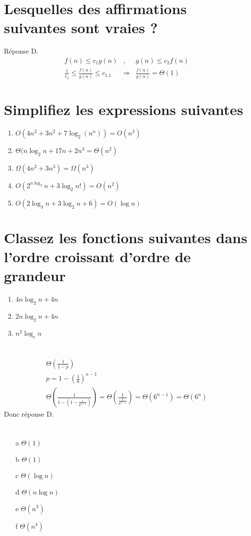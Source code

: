 \section{Lesquelles des affirmations suivantes sont vraies ?}
Réponse D. 
\begin{eqnarray*}
	f(n) \leq c_1 g(n)&,& g(n) \leq c_2 f(n)\\
	\frac{1}{c_2} \leq \frac{f(n)}{g(n)} \leq c_1.1 &\Rightarrow& \frac{f(n)}{g(n)} = \Theta(1)
\end{eqnarray*}
\section{Simplifiez les expressions suivantes}
\begin{enumerate}
	\item $O(4n^2+3n^2+7\log_2(n^n)) = O(n^3)$ 
	\item $\Theta(n\log_2 n + 17n + 2n^3 = \Theta (n^2)$ 
	\item $\Omega(4n^2 + 3n^3) = \Omega(n^3)$ 
	\item $O(2^{n\log_3}n + 3\log_2 n!) = O(n^2)$
	\item $O(2\log_3 n + 3\log_2 n + 6) = O(\log n)$
\end{enumerate}
\section{Classez les fonctions suivantes dans l'ordre croissant d'ordre de grandeur}
\begin{enumerate}
\item $4n \log_2 n + 4n$
\item $2n \log_2 n + 4n$
\item $n^2 \log_e n$
\end{enumerate}

\section{}
\begin{eqnarray*}
	\Theta(\frac{1}{1-p})\\
	p = 1 - (\frac{1}{6})^{n-1}\\
	\Theta(\frac{1}{1-(1-\frac{1}{6^{n-1}})}) = \Theta(\frac{1}{\frac{1}{6^{n-1}}}) = \Theta(6^{n-1}) = \Theta(6^n)
\end{eqnarray*}
Donc réponse D.
\section{}
\begin{enumerate}
	\item[a]$\Theta(1)$
	\item[b] $\Theta(1)$
	\item[c] $\Theta(\log n)$
	\item[d] $\Theta(n\log n)$
	\item[e] $\Theta(n^3)$
	\item[f] $\Theta(n^4)$
\end{enumerate}


